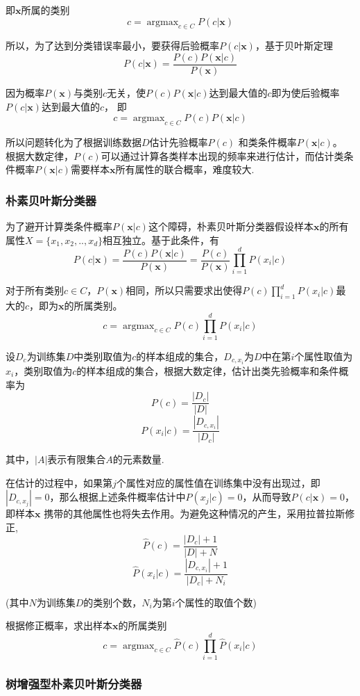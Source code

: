 \documentclass{ctexart}
\begin{document}
即$\bm{x}$所属的类别 $$c=\mathop{\arg\max}_{c\in C}P(c|\bm{x})$$

所以，为了达到分类错误率最小，要获得后验概率$P(c|\bm{x})$，基于贝叶斯定理
$$P(c|\bm{x})=\frac{P(c)P(\bm{x}|c)}{P(\bm{x})}$$

因为概率$P(\bm{x})$与类别$c$无关，使$P(c)P(\bm{x}|c)$达到最大值的$c$即为使后验概率$P(c|\bm{x})$达到最大值的$c$，
即
$$c=\mathop{\arg\max}_{c\in C}P(c)P(\bm{x}|c)$$

所以问题转化为了根据训练数据$D$估计先验概率$P(c)$ 和类条件概率$P(\bm{x}|c)$。 根据大数定律，$P(c)$可以通过计算各类样本出现的频率来进行估计，而估计类条件概率$P(\bm{x}|c)$需要样本$\bm{x}$所有属性的联合概率，难度较大.

\subsubsection{朴素贝叶斯分类器}

为了避开计算类条件概率$P(\bm{x}|c)$这个障碍，朴素贝叶斯分类器假设样本$\bm{x}$的所有属性$X=\{x_{1},x_{2},..,x_{d}\}$相互独立。基于此条件，有
$$P(c|\bm{x})=\frac{P(c)P(\bm{x}|c)}{P(\bm{x})}=\frac{P(c)}{P(\bm{x})}\prod_{i=1}^{d}P(x_{i}|c)$$

对于所有类别$c\in C$，$P(\bm{x})$相同，所以只需要求出使得$P(c)\prod_{i=1}^{d}P(x_{i}|c)$最大的$c$，即为$\bm{x}$的所属类别。
$$c=\mathop{\arg\max}_{c\in C}P(c)\prod_{i=1}^{d}P(x_{i}|c)$$

设$D_{c}$为训练集$D$中类别取值为$c$的样本组成的集合，$D_{c,x_{i}}$为$D$中在第$i$个属性取值为$x_{i}$，类别取值为$c$的样本组成的集合，根据大数定律，估计出类先验概率和条件概率为
$$P(c)=\frac{|D_{c}|}{|D|}$$
$$P(x_{i}|c)=\frac{|D_{c,x_{i}}|}{|D_{c}|}$$

其中，$|A|$表示有限集合$A$的元素数量.

在估计的过程中，如果第$j$个属性对应的属性值在训练集中没有出现过，即$|D_{c,x_{j}}|=0$，那么根据上述条件概率估计中$P(x_{j}|c)=0$，从而导致$P(c|\bm{x})=0$，即样本$\bm{x}$ 携带的其他属性也将失去作用。为避免这种情况的产生，采用拉普拉斯修正,
$$\hat{P}(c)=\frac{|D_{c}|+1}{|D|+N}$$
$$\hat{P}(x_{i}|c)=\frac{|D_{c,x_{i}}|+1}{|D_{c}|+N_{i}}$$

(其中$N$为训练集$D$的类别个数，$N_{i}$为第$i$个属性的取值个数)

根据修正概率，求出样本$\bm{x}$的所属类别
$$c=\mathop{\arg\max}_{c\in C}\hat{P}(c)\prod_{i=1}^{d}\hat{P}(x_{i}|c)$$

\subsubsection{树增强型朴素贝叶斯分类器}
\end{document}
